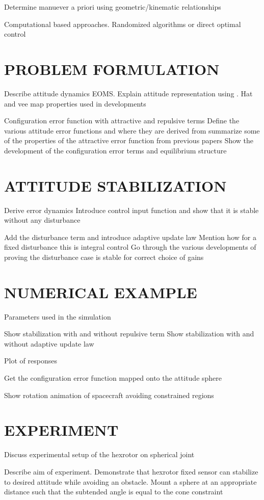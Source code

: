 \documentclass[letterpaper, 10 pt, conference]{ieeeconf}  %
\begin{document}
Determine manuever a priori using geometric/kinematic relationships

Computational based approaches.
Randomized algorithms or direct optimal control

\section{PROBLEM FORMULATION}

Describe attitude dynamics EOMS.
Explain attitude representation using \SO.
Hat and vee map properties used in developments

Configuration error function with attractive and repulsive terms
Define the various attitude error functions and where they are derived from
summarize some of the properties of the attractive error function from previous papers
Show the development of the configuration error terms and equilibrium structure
\section{ATTITUDE STABILIZATION}

Derive error dynamics
Introduce control input function and show that it is stable without any disturbance

Add the disturbance term and introduce adaptive update law
Mention how for a fixed disturbance this is integral control 
Go through the various developments of proving the disturbance case is stable for correct choice of gains

\section{NUMERICAL EXAMPLE}
Parameters used in the simulation

Show stabilization with and without repulsive term
Show stabilization with and without adaptive update law

Plot of responses

Get the configuration error function mapped onto the attitude sphere

Show rotation animation of spacecraft avoiding constrained regions
\section{EXPERIMENT}

Discuss experimental setup of the hexrotor on spherical joint

Describe aim of experiment. 
Demonstrate that hexrotor fixed sensor can stabilize to desired attitude while avoiding an obstacle.
Mount a sphere at an appropriate distance such that the subtended angle is equal to the cone constraint
\end{document}
